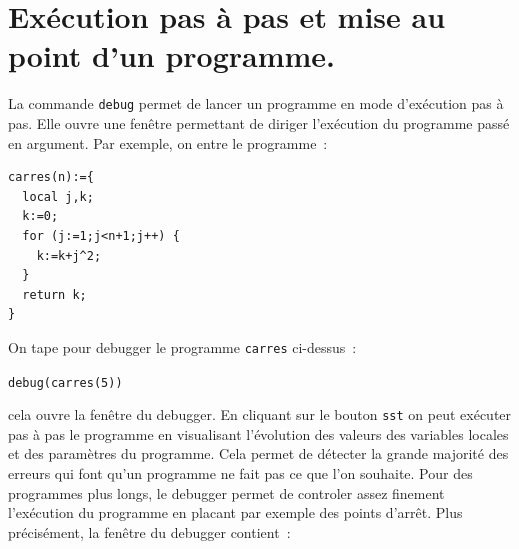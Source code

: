 \documentclass[a4paper,11pt]{article}
\begin{document}
\section{Ex\'ecution pas \`a pas et mise au point d'un programme.}
La commande {\tt debug} permet de lancer un programme en mode
d'ex\'ecution pas \`a pas. Elle ouvre une fen\^etre permettant
de diriger l'ex\'ecution du programme pass\'e en argument.
Par exemple, on entre le programme~:
\begin{verbatim}
carres(n):={
  local j,k;
  k:=0;
  for (j:=1;j<n+1;j++) {
    k:=k+j^2;
  }
  return k;
}
\end{verbatim}
On tape pour debugger le programme {\tt carres} ci-dessus~:
\begin{center}
{\tt debug(carres(5))}
\end{center}
cela ouvre la fen\^etre du debugger.
En cliquant sur le bouton {\tt sst} on peut ex\'ecuter pas \`a pas
le programme en visualisant l'\'evolution des valeurs des variables
locales et des param\`etres du programme. Cela permet de d\'etecter
la grande majorit\'e des erreurs qui font qu'un programme ne fait
pas ce que l'on souhaite. Pour des programmes plus longs, 
le debugger permet de controler
assez finement l'ex\'ecution du programme en placant par exemple
des points d'arr\^et.
Plus pr\'ecis\'ement, la fen\^etre du debugger contient~:
\end{document}
